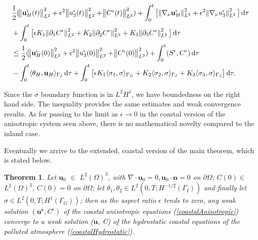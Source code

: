 \documentclass[11pt]{article}
\newtheorem{theorem}{Theorem}
\newcommand*\diff{\mathop{}\!\mathrm{d}}
\begin{document}
  \begin{equation}
    \begin{split}  
    & \frac{1}{2} (\norm{\mathbf{u}_H^\epsilon (t)}_{L^2}^2 + \epsilon ^ 2 \norm{u_3^\epsilon (t)}_{L^2}^2 + \norm{C^\epsilon (t)}_{L^2}^2) + \int_0 ^ t \big [ \norm{\nabla_\nu \mathbf{u}_H^\epsilon}_{L^2}^2 + \epsilon ^ 2 \norm{\nabla_\nu u_3^\epsilon}_{L^2}^2 \big ] \diff \tau \\
    & + \int_0 ^ t \big [ \epsilon K_1 \norm{\partial_1 C^\epsilon}_{L^2}^2  + K_2 \norm{\partial_2 C^\epsilon}_{L^2}^2 + K_3 \norm{\partial_3 C^\epsilon}_{L^2}^2 \big ] \diff \tau \\
    & \leq \frac{1}{2} (\norm{\mathbf{u}_H^\epsilon (0)}_{L^2}^2 + \epsilon ^ 2 \norm{u_3^\epsilon (0)}_{L^2}^2 + \norm{C^\epsilon (0)}_{L^2}^2) + \int_0^t (S^\epsilon,C^\epsilon) \diff \tau \\
    & - \int_0^t \langle \theta_H, \mathbf{u}_H \rangle _{\Gamma_I} \diff \tau + \int _ 0 ^ t \big [ \epsilon K_1 \langle \sigma_1, \sigma \rangle_{\Gamma_G} + K_2 \langle \sigma_2 , \sigma \rangle_{\Gamma_I}  + K_3 \langle \sigma_3, \sigma \rangle_{\Gamma_I} \big ] \diff \tau. \raisetag{50pt} \label{EIQCG}
    \end{split}
  \end{equation}
  
Since the $\sigma$ boundary function is in $L^2 H^1$, we have boundedness on the right hand side. The inequality provides the same estimates and weak convergence results. As for passing to the limit as $\epsilon \to 0$ in the coastal version of the anisotropic system seen above, there is no mathematical novelty compared to the inland case.

Eventually we arrive to the extended, coastal version of the main theorem, which is stated below.

\begin{theorem}
  Let $\mathbf{u}_0$ $\in$ $L^2 (\Omega)^3$, with $\nabla \cdot \mathbf{u}_0 = 0, \mathbf{u}_0 \cdot \mathbf{n} = 0$ on $\partial \Omega$; $C(0)\in$ $L^2 (\Omega)^3$, $C(0) = 0$ on $ \partial \Omega$; let $\theta_1, \theta_2 \in L^2 (0, T; H^{-1/2}(\Gamma_I))$ and finally let $\sigma \in L^2 (0, T; H^1 (\Gamma_G))$; then as the aspect ratio $\epsilon$ tends to zero, any weak solution $(\mathbf{u^\epsilon}, C^\epsilon)$ of the coastal anisotropic equations (\ref{coastalAnisotropic}) converge to a weak solution ($\mathbf{u}$, C) of the hydrostatic coastal equations of the polluted atmosphere (\ref{coastalHydrostatic}).
\end{theorem}
\end{document}
